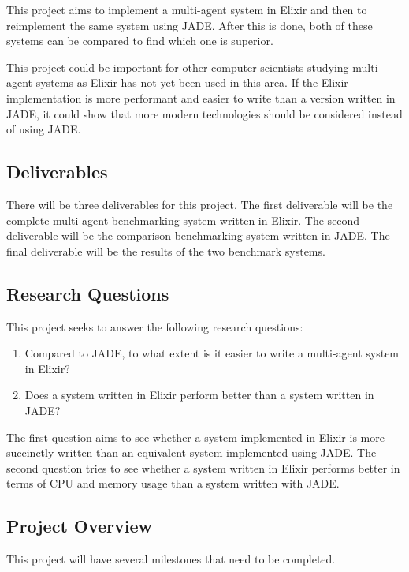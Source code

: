 This project aims to implement a multi-agent system in Elixir and then to reimplement the same system using JADE\@.
After this is done, both of these systems can be compared to find which one is superior.

This project could be important for other computer scientists studying multi-agent systems as Elixir has not yet been used in this area.
If the Elixir implementation is more performant and easier to write than a version written in JADE, it could show that more modern technologies should be considered instead of using JADE\@.

\subsection{Deliverables}

There will be three deliverables for this project.
The first deliverable will be the complete multi-agent benchmarking system written in Elixir.
The second deliverable will be the comparison benchmarking system written in JADE\@.
The final deliverable will be the results of the two benchmark systems.

\subsection{Research Questions}

This project seeks to answer the following research questions:

\begin{enumerate}
    \item Compared to JADE, to what extent is it easier to write a multi-agent system in Elixir?
    \item Does a system written in Elixir perform better than a system written in JADE\@?
\end{enumerate}

The first question aims to see whether a system implemented in Elixir is more succinctly written than an equivalent system implemented using JADE\@.
The second question tries to see whether a system written in Elixir performs better in terms of CPU and memory usage than a system written with JADE\@.

\subsection{Project Overview}

This project will have several milestones that need to be completed.

